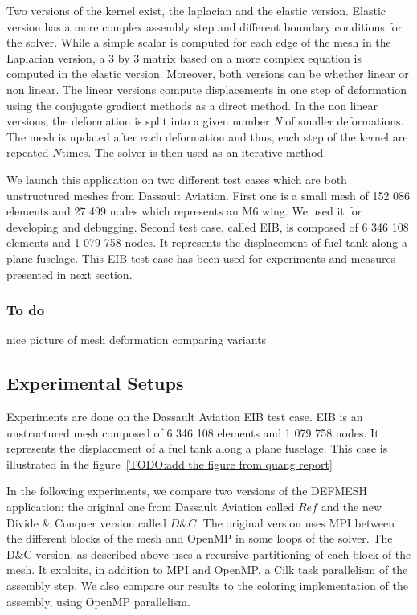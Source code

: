 \documentclass{IOS-Book-Article}
\begin{document}
Two versions of the kernel exist, the laplacian and the elastic version. Elastic version has a more complex assembly step and different boundary conditions for the solver.
While a simple scalar is computed for each edge of the mesh in the Laplacian version, a 3 by 3 matrix based on a more complex equation is computed in the elastic version.
Moreover, both versions can be whether linear or non linear.
The linear versions compute displacements in one step of deformation using the conjugate gradient methods as a direct method.
In the non linear versions, the deformation is split into a given number \emph{N} of smaller deformations.
The mesh is updated after each deformation and thus, each step of the kernel are repeated $N$times. The solver is then used as an iterative method.

We launch this application on two different test cases which are both unstructured meshes from Dassault Aviation.
First one is a small mesh of 152 086 elements and 27 499 nodes which represents an M6 wing. We used it for developing and debugging.
Second test case, called EIB, is composed of 6 346 108 elements and 1 079 758 nodes. It represents the displacement of fuel tank along a plane fuselage.
This EIB test case has been used for experiments and measures presented in next section.

\subsubsection{To do}
nice picture of mesh deformation comparing variants\\

\subsection{Experimental Setups}
Experiments are done on the Dassault Aviation EIB test case. EIB is an unstructured mesh composed of 6 346 108 elements and 1 079 758 nodes. It represents the displacement of a fuel tank along a plane fuselage. This case is illustrated in the figure~\ref{TODO:add the figure from quang report}

In the following experiments, we compare two versions of the DEFMESH application: the original one from Dassault Aviation called $Ref$ and the new Divide \& Conquer
version called $D\&C$.
The original version uses MPI between the different blocks of the mesh and OpenMP in some loops of the solver.
The D\&C version, as described above uses a recursive partitioning of each block of the mesh. It exploits, in addition to MPI and OpenMP,
a Cilk task parallelism of the assembly step.
We also compare our results to the coloring implementation of the assembly, using OpenMP parallelism.
\end{document}
